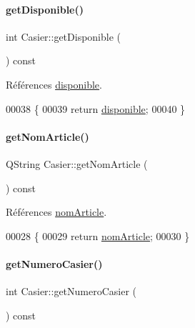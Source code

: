 \paragraph{\texorpdfstring{get\+Disponible()}{getDisponible()}}
{\footnotesize\ttfamily int Casier\+::get\+Disponible (\begin{DoxyParamCaption}{ }\end{DoxyParamCaption}) const}



Références \hyperlink{class_casier_a5bf1314910ade36747faffdd891d94e9}{disponible}.


\begin{DoxyCode}
00038 \{
00039     \textcolor{keywordflow}{return} \hyperlink{class_casier_a5bf1314910ade36747faffdd891d94e9}{disponible};
00040 \}
\end{DoxyCode}
\mbox{\label{class_casier_ad1e4ebd48218bc19d8e29e98b6a9e939}} 
\paragraph{\texorpdfstring{get\+Nom\+Article()}{getNomArticle()}}
{\footnotesize\ttfamily Q\+String Casier\+::get\+Nom\+Article (\begin{DoxyParamCaption}{ }\end{DoxyParamCaption}) const}



Références \hyperlink{class_casier_a9632bfa0e94a522bab9da1c3834eaf5a}{nom\+Article}.


\begin{DoxyCode}
00028 \{
00029     \textcolor{keywordflow}{return} \hyperlink{class_casier_a9632bfa0e94a522bab9da1c3834eaf5a}{nomArticle};
00030 \}
\end{DoxyCode}
\mbox{\label{class_casier_a77004d988048cf4c8ad521800745be73}} 
\paragraph{\texorpdfstring{get\+Numero\+Casier()}{getNumeroCasier()}}
{\footnotesize\ttfamily int Casier\+::get\+Numero\+Casier (\begin{DoxyParamCaption}{ }\end{DoxyParamCaption}) const}



